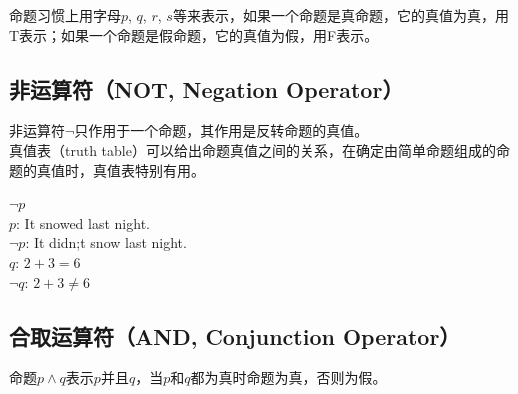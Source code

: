 \documentclass[12pt, openany, oneside]{book}
\begin{document}
命题习惯上用字母$ p $, $ q $, $ r $, $ s $等来表示，如果一个命题是真命题，它的真值为真，用T表示；如果一个命题是假命题，它的真值为假，用F表示。 \\

\subsection{非运算符（NOT, Negation Operator）}

非运算符$ \neg $只作用于一个命题，其作用是反转命题的真值。 \\

真值表（truth table）可以给出命题真值之间的关系，在确定由简单命题组成的命题的真值时，真值表特别有用。

\begin{table}[H]
	\centering
	\caption{NOT真值表}
\end{table}

\begin{tcolorbox}
	$ \neg p $ \\
	$ p $: It snowed last night. \\
	$ \neg p $: It didn;t snow last night. \\
	$ q $: $ 2 + 3 = 6 $ \\
	$ \neg q $: $ 2 + 3 \ne 6 $
\end{tcolorbox}

\subsection{合取运算符（AND, Conjunction Operator）}

命题$ p \wedge q $表示$ p $并且$ q $，当$ p $和$ q $都为真时命题为真，否则为假。

\begin{table}[H]
	\centering
	\caption{AND真值表}
\end{table}
\end{document}

